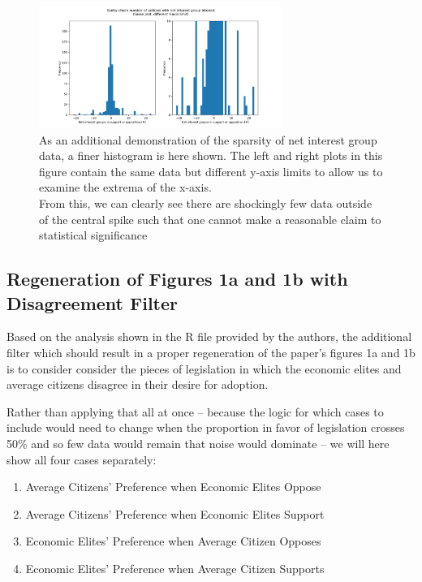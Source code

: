 \documentclass[]{article}
\begin{document}
\begin{figure}[H]
	\begin{center}
		\includegraphics[width=300px]{./figures/generated/interest-group-count-histogram.png}
	\end{center}	
	\caption{As an additional demonstration of the sparsity of net interest group data, a finer histogram is here shown. The left and right plots in this figure contain the same data but different y-axis limits to allow us to examine the extrema of the x-axis. \\From this, we can clearly see there are shockingly few data outside of the central spike such that one cannot make a reasonable claim to statistical significance}
	\label{generated_figure1c_data_sparsity}
\end{figure}

\subsection{Regeneration of Figures 1a and 1b with Disagreement Filter}
Based on the analysis shown in the R file provided by the authors, the additional filter which should result in a proper regeneration of the paper's figures 1a and 1b is to consider consider the pieces of legislation in which the economic elites and average citizens disagree in their desire for adoption.

Rather than applying that all at once -- because the logic for which cases to include would need to change when the proportion in favor of legislation crosses 50\% and so few data would remain that noise would dominate -- we will here show all four cases separately:
\begin{enumerate}
	\item Average Citizens' Preference when Economic Elites Oppose
	\item Average Citizens' Preference when Economic Elites Support
	\item Economic Elites' Preference when Average Citizen Opposes
	\item Economic Elites' Preference when Average Citizen Supports
\end{enumerate}
\end{document}

